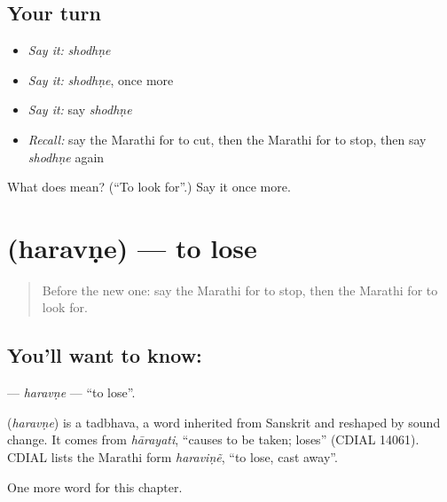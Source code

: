 \subsection*{Your turn}
\begin{itemize}
\raggedright
  \item \emph{Say it:} \emph{shodhṇe}
  \item \emph{Say it:} \emph{shodhṇe}, once more
  \item \emph{Say it:} say \emph{shodhṇe}
  \item \emph{Recall:} say the Marathi for to cut, then the Marathi for to stop, then say \emph{shodhṇe} again
\end{itemize}

\begin{tcolorbox}[breakable,colback=teal!4,colframe=teal!35!black,title={Before you move on}]
What does  mean? (\textquotedblleft{}To look for\textquotedblright{}.) Say it once more.
\end{tcolorbox}
\section[\texorpdfstring{\mr{हरवणे} (haravṇe)}{हरवणे (haravṇe)}]{ (haravṇe) — to lose}

\label{lesson:MR-C81-haravne}



\begin{quote}
Before the new one: say the Marathi for to stop, then the Marathi for to look for.
\end{quote}

\subsection*{You'll want to know: }
\textbf{} — \emph{haravṇe} — \textquotedblleft{}to lose\textquotedblright{}.

\begin{cousinweb}
\textbf{} (\emph{haravṇe}) is a tadbhava, a word inherited from Sanskrit and reshaped by sound change. It comes from \emph{hārayati}, \textquotedblleft{}causes to be taken; loses\textquotedblright{} (CDIAL 14061). CDIAL lists the Marathi form \emph{haraviṇẽ}, \textquotedblleft{}to lose, cast away\textquotedblright{}.
\end{cousinweb}

\begin{grammarlens}[title={What you've built}]
One more word for this chapter.
\end{grammarlens}

